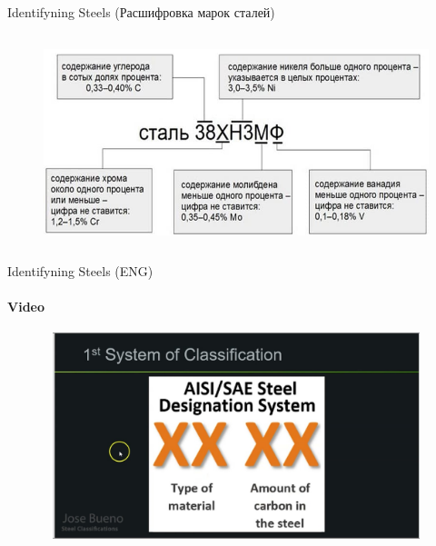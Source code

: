 \documentclass[aspectratio=169]{beamer}
\newcommand{\fbckg}[1]{\usebackgroundtemplate{\texttt{[image: \#1]}}}%
\begin{document}
\begin{frame}[t]{Identifyning Steels (Расшифровка марок сталей)}
\framesubtitle{}
    \vspace{-0.6cm}
    \begin{figure}[H]
        \centering\includegraphics[height=6cm,width=1\textwidth,keepaspectratio]{rus_marker.jpg}
        \label{fig:rus_marker.jpg}
    \end{figure}
\end{frame}

\begin{frame}[t]{Identifyning Steels (ENG)}
    \framesubtitle{Video}
    \vspace{-0.6cm}
    \begin{figure}[H]
        \href{https://youtu.be/gXXRGjddQOM}{
            \centering\includegraphics[height=6cm,width=1\textwidth,keepaspectratio]{identifying_steel_video.jpg}}
        \label{fig:identifying_steel_video.jpg}
    \end{figure}
\end{frame}







\fbckg{fibeamer/figs/last_page.png}
\frame[plain]{}
\end{document}

